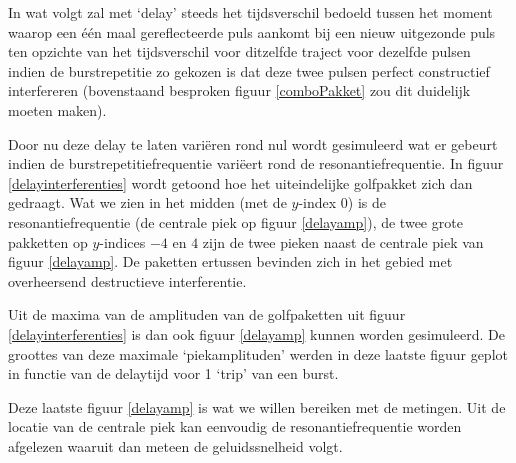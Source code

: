 
In wat volgt zal met `delay' steeds het tijdsverschil bedoeld tussen het 
moment waarop een \'e\'en maal gereflecteerde puls aankomt bij een nieuw 
uitgezonde puls ten opzichte van het tijdsverschil voor ditzelfde traject 
voor dezelfde pulsen indien de burstrepetitie zo gekozen is dat deze twee 
pulsen perfect constructief interfereren (bovenstaand besproken figuur 
\ref{comboPakket} zou dit duidelijk moeten maken).

Door nu deze delay te laten vari\"eren rond nul wordt gesimuleerd wat er 
gebeurt indien de burstrepetitiefrequentie vari\"eert rond de 
resonantiefrequentie. In figuur \ref{delayinterferenties} wordt getoond hoe 
het uiteindelijke golfpakket zich dan gedraagt. Wat we zien in het midden 
(met de $y$-index 0) is de resonantiefrequentie (de centrale piek op figuur 
\ref{delayamp}), de twee grote pakketten op $y$-indices $-4$ en $4$ zijn de 
twee pieken naast de centrale piek van figuur \ref{delayamp}. De paketten 
ertussen bevinden zich in het gebied met overheersend destructieve 
interferentie.


Uit de maxima van de amplituden van de golfpaketten uit figuur 
\ref{delayinterferenties} is dan ook figuur \ref{delayamp} kunnen worden 
gesimuleerd. De groottes van deze maximale `piekamplituden' werden in deze 
laatste figuur geplot in functie van de delaytijd voor 1 `trip' van een 
burst.

Deze laatste figuur \ref{delayamp} is wat we willen bereiken met de 
metingen. Uit de locatie van de centrale piek kan eenvoudig de 
resonantiefrequentie worden afgelezen waaruit dan meteen de geluidssnelheid 
volgt.


